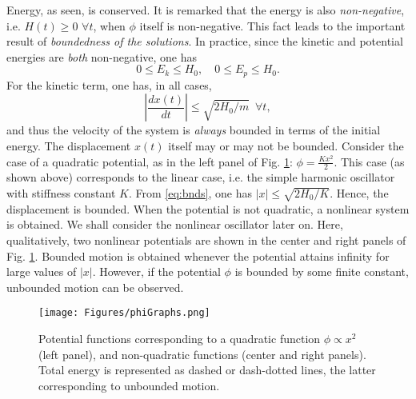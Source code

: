 \documentclass[11pt,twoside,a4paper,english]{book}
\begin{document}
Energy, as seen, is conserved. It is remarked that the energy is also \emph{non-negative}, i.e. $H(t) \geq 0$ $\forall t$, when $\phi$ itself is non-negative. This fact leads to the important result of \emph{boundedness of the solutions}. In practice, since the kinetic and potential energies are \emph{both} non-negative, one has
\begin{equation}\label{eq:bnds}
    0 \leq E_k \leq H_0, \quad 0\leq E_p\leq H_0.
\end{equation} 
For the kinetic term, one has, in all cases,
\begin{equation}\label{eq:EgyBoundVel}
    \left|\frac{dx(t)}{dt}\right| \leq \sqrt{2 H_0/m}\,\,\, \forall t,
\end{equation} 
and thus the velocity of the system is \emph{always} bounded in terms of the initial energy. The displacement $x(t)$ itself may or may not be bounded. Consider the case of a quadratic potential, as in the left panel of Fig. \ref{fig:phis}: $\phi = \frac{K x^2}{2}$. This case (as shown above) corresponds to the linear case, i.e. the simple harmonic oscillator with stiffness constant $K$. From \eqref{eq:bnds}, one has $|x|\leq \sqrt{2 H_0/K}$. Hence,  the displacement is bounded. When the potential is not quadratic, a nonlinear system is obtained. We shall consider the nonlinear oscillator later on. Here, qualitatively, two nonlinear potentials are shown in the center and right panels of Fig. \ref{fig:phis}. Bounded motion is obtained whenever the potential attains infinity for large values of $|x|$. However, if the potential $\phi$ is bounded by some finite constant, unbounded motion can be observed.
\begin{figure}
    \texttt{[image: Figures/phiGraphs.png]}
    \caption{Potential functions corresponding to a quadratic function $\phi  \propto x^2$ (left panel), and non-quadratic functions (center and right panels). Total energy is represented as dashed or dash-dotted lines, the latter corresponding to unbounded motion. }\label{fig:phis}
\end{figure}
\end{document}
